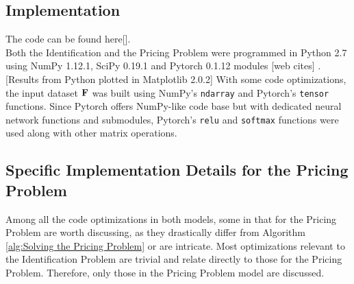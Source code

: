 \begin{appendices}
    \section{Implementation} \label{app:Implementation}
    The code can be found here[]. \\
    Both the Identification and the Pricing Problem were programmed in Python 2.7 using NumPy 1.12.1, SciPy 0.19.1 and Pytorch 0.1.12 modules [web cites] \cite{SCPOptimizeDocs}\cite{NPDocs}. [Results from Python plotted in Matplotlib 2.0.2] With some code optimizations, the input dataset $\mathbf{F}$ was built using NumPy's \texttt{ndarray} and Pytorch's \texttt{tensor} functions. Since Pytorch offers NumPy-like code base but with dedicated neural network functions and submodules, Pytorch's \texttt{relu} and \texttt{softmax} functions were used along with other matrix operations.\\
    
    \subsection{Specific Implementation Details for the Pricing Problem}
    Among all the code optimizations in both models, some in that for the Pricing Problem are worth discussing, as they drastically differ from Algorithm \ref{alg:Solving the Pricing Problem} or are intricate. Most optimizations relevant to the Identification Problem are trivial and relate directly to those for the Pricing Problem. Therefore, only those in the Pricing Problem model are discussed.
    

\end{appendices}
